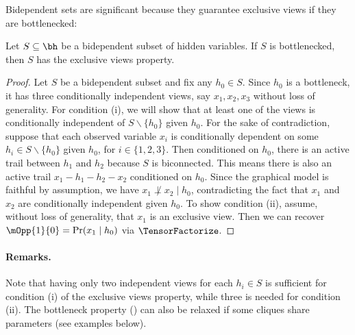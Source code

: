 Bidependent sets are significant because they guarantee exclusive views if they
are bottlenecked:
\begin{lemma}
  \label{lem:bottleneck-views}  
  Let $S \subseteq \bh$ be a bidependent subset of hidden variables.
  If $S$ is bottlenecked, then $S$ has the exclusive views property.
\end{lemma}
\begin{proof}
Let $S$ be a bidependent subset and fix any $h_0 \in S$.
Since $h_0$ is a bottleneck, it has three conditionally independent views,
say $x_1, x_2, x_3$ without loss of generality. 
For condition (i), we will show that at least one of the views is conditionally independent
of $S \backslash \{ h_0 \}$ given $h_0$.
For the sake of contradiction, 
suppose that each observed variable $x_i$ is conditionally dependent on some
$h_i \in S \backslash \{h_0\}$ given $h_0$, for $i \in \{1, 2, 3\}$.
Then conditioned on $h_0$,
there is an active trail between $h_1$ and $h_2$ because $S$ is biconnected.
This means there is also an active trail $x_1 - h_1 - h_2 - x_2$ conditioned on $h_0$.
Since the graphical model is faithful by assumption, we have $x_1 \not\perp x_2 \mid h_0$,
contradicting the fact that $x_1$ and $x_2$ are conditionally independent given $h_0$.
To show condition (ii), assume, without loss of generality, that $x_1$ is an exclusive view.
Then we can recover $\mOpp{1}{0} = \Pr(x_1 \mid h_0)$ via $\TensorFactorize$.
\end{proof}


\paragraph{Remarks.}
Note that having only two independent views for each $h_i \in S$ is sufficient for condition (i)
  of the exclusive views property, while three is needed for condition (ii).
The bottleneck property () can also be relaxed if some cliques
  share parameters (see examples below).


